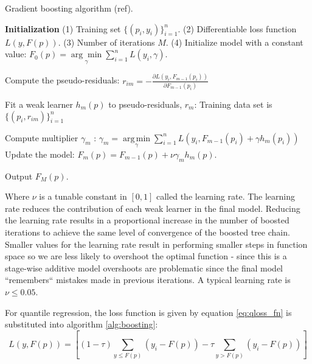 \begin{algorithm}[H]
    \caption{Gradient boosting algorithm (ref).}
    \begin{algorithmic}
    \STATE \textbf{Initialization} 
    \STATE (1) Training set $\{(p_i, y_i)\}_{i=1}^n$. 
    \STATE (2) Differentiable loss function $L(y, F(p))$. 
    \STATE (3) Number of iterations ${{M}}$.
    \STATE (4)   Initialize model with a constant value:
        $F_0(p) = \underset{\gamma}{\arg\min} \sum_{i=1}^n L(y_i, \gamma).$
    
        \STATE Compute the pseudo-residuals:  
            \STATE $r_{im} = -\frac{\partial L(y_i, F_{m-1}(p_i))}{\partial F_{m-1}(p_i)}$
        \ENDFOR
        
        \STATE Fit a weak learner $h_m(p)$ to pseudo-residuals, $r_{m}$: Training data set is $\{(p_i, r_{im})\}_{i=1}^n$ \;
        
        \STATE Compute multiplier $\gamma_m$ :
        $\gamma_m = \underset{\gamma}{\operatorname{arg\,min}} \sum_{i=1}^n L\left(y_i, F_{m-1}(p_i) + \gamma h_m(p_i)\right)$\;
        \STATE Update the model:
        $F_m(p) = F_{m-1}(p) + \nu \gamma_m h_m(p).$
    
    \ENDFOR
    \STATE Output $F_M(p).$
    \end{algorithmic}
\label{alg:boosting}
\end{algorithm}
Where $\nu$ is a tunable constant in $[0, 1]$ called the learning rate.  The learning rate reduces the contribution of each weak learner in the final model.  Reducing the learning rate results in a proportional increase in the number of boosted iterations to achieve the same level of convergence of the boosted tree chain.  Smaller values for the learning rate result in performing smaller steps in function space so we are less likely to overshoot the optimal function - since this is a stage-wise additive model overshoots are problematic since the final model ``remembers`` mistakes made in previous iterations.  A typical learning rate is $\nu\leq 0.05$.

For quantile regression, the loss function is given by equation \ref{eq:qloss_fn} is substituted into algorithm \ref{alg:boosting}:
\begin{equation}
L(y, F(p)) = \left[ (1-\tau) \sum_{y \leq F(p)}( y_i - F(p) ) - \tau \sum_{y > F(p)} (y_i - F(p)) \right]
\end{equation}

